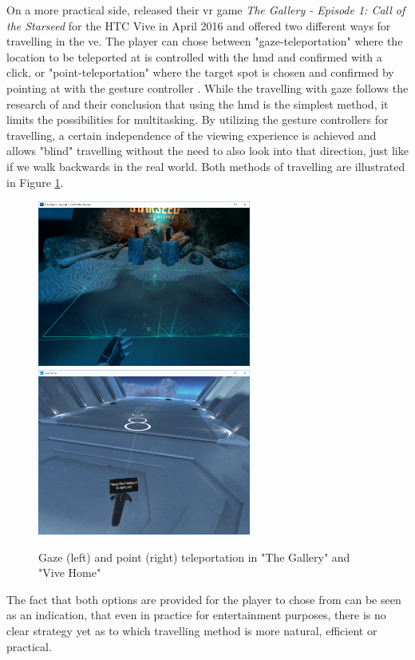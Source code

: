 On a more practical side, \cite{CloudheadGames2016} released their \gls{vr} game \textit{The Gallery - Episode 1: Call of the Starseed} for the HTC Vive in April 2016 and offered two different ways for travelling in the \gls{ve}. The player can chose between "gaze-teleportation" where the location to be teleported at is controlled with the \gls{hmd} and confirmed with a click, or "point-teleportation" where the target spot is chosen and confirmed by pointing at with the gesture controller \citep{CloudheadGames2016}. While the travelling with gaze follows the research of \cite{Jamieson2007} and their conclusion that using the \gls{hmd} is the simplest method, it limits the possibilities for multitasking. By utilizing the gesture controllers for travelling, a certain independence of the viewing experience is achieved and allows "blind" travelling without the need to also look into that direction, just like if we walk backwards in the real world. Both methods of travelling are illustrated in Figure \ref{fig:gazePointTeleportation}.
\begin{figure}[h]
	\begin{center}
		\includegraphics[width=7cm]{03_Figures/05_LitReview/Cloudhead2016_TheGallery2.png}
		\includegraphics[width=7cm]{03_Figures/05_LitReview/HTCVive2016_ViveHome.png}
		\caption[Gaze and point teleportation in "The Gallery" and "Vive Home"]{Gaze (left) and point (right) teleportation in "The Gallery"  \citep{CloudheadGames2016} and "Vive Home" \citep{Htcvive2016a}}
		\label{fig:gazePointTeleportation}
	\end{center}
\end{figure} \newline
The fact that both options are provided for the player to chose from can be seen as an indication, that even in practice for entertainment purposes, there is no clear strategy yet as to which travelling method is more natural, efficient or practical.

